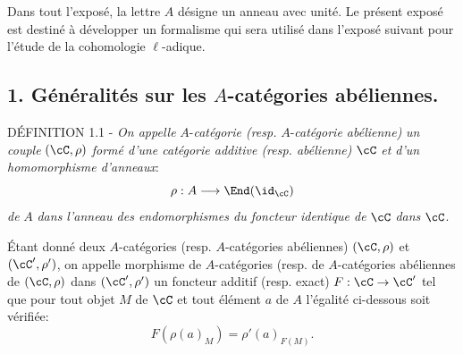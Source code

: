 Dans tout l'exposé, la lettre $A$ désigne un anneau avec unité. Le présent exposé est destiné à développer un formalisme qui sera utilisé dans l'exposé suivant pour l'étude de la cohomologie $\ell$-adique.

\subsection*{1. Généralités sur les $A$-catégories abéliennes.}

\begin{statement}{DÉFINITION 1.1}
- \emph{On appelle} $A$-\emph{catégorie (resp.} $A$-\emph{catégorie abélienne)} \emph{un couple} $(\cC,\rho)$ \emph{formé d'une catégorie additive (resp. abélienne)} $\cC$ \emph{et d'un homomorphisme d'anneaux}:
\[
\rho:A\longrightarrow \End(\id_{\cC})
\]
\emph{de} $A$ \emph{dans l'anneau des endomorphismes du foncteur identique de} $\cC$ \emph{dans} $\cC$.
\end{statement}

Étant donné deux $A$-catégories (resp. $A$-catégories abéliennes) $(\cC,\rho)$ et $(\cC',\rho')$, on appelle morphisme de $A$-catégories (resp. de $A$-catégories abéliennes de $(\cC,\rho)$ dans $(\cC',\rho')$ un foncteur additif (resp. exact) $F:\cC\to\cC'$ tel que pour tout objet $M$ de $\cC$ et tout élément $a$ de $A$ l'égalité ci-dessous soit vérifiée:
\[
F(\rho(a)_M)=\rho'(a)_{F(M)}.
\]

